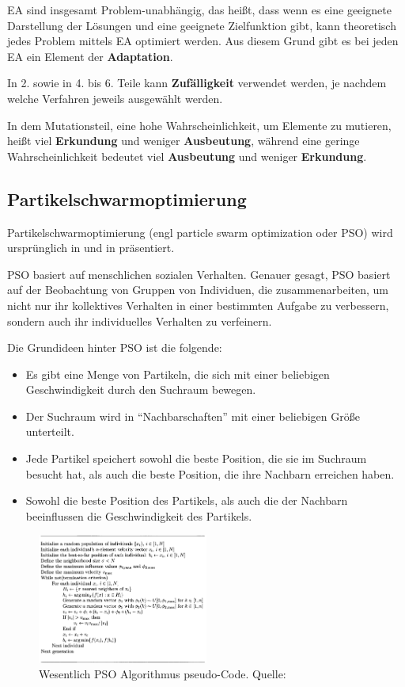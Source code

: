 \documentclass[twoside,twocolumn]{article}
\begin{document}
EA sind insgesamt Problem-unabhängig, das heißt, dass wenn es eine geeignete Darstellung der Lösungen und eine geeignete Zielfunktion gibt, kann theoretisch jedes Problem mittels EA optimiert werden. Aus diesem Grund gibt es bei jeden EA ein Element der \textbf{Adaptation}.\par
In 2. sowie in 4. bis 6. Teile kann \textbf{Zufälligkeit} verwendet werden, je nachdem welche Verfahren jeweils ausgewählt werden.\par
In dem Mutationsteil, eine hohe Wahrscheinlichkeit, um Elemente zu mutieren, heißt viel \textbf{Erkundung} und weniger \textbf{Ausbeutung}, während eine geringe Wahrscheinlichkeit bedeutet viel \textbf{Ausbeutung} und weniger \textbf{Erkundung}.

\subsection{Partikelschwarmoptimierung}
Partikelschwarmoptimierung (engl particle swarm optimization oder PSO) wird ursprünglich in \cite{kennedy_pso} und in \cite{shi_pso} präsentiert.\par
PSO basiert auf menschlichen sozialen Verhalten. \cite{eberhart_pso} Genauer gesagt, PSO basiert auf der Beobachtung von Gruppen von Individuen, die zusammenarbeiten, um nicht nur ihr kollektives Verhalten in einer bestimmten Aufgabe zu verbessern, sondern auch ihr individuelles Verhalten zu verfeinern.\par
Die Grundideen hinter PSO ist die folgende:

\begin{itemize}
\item{Es gibt eine Menge von Partikeln, die sich mit einer beliebigen Geschwindigkeit durch den Suchraum bewegen.}
\item{Der Suchraum wird in \enquote{Nachbarschaften} mit einer beliebigen Größe unterteilt.}
\item{Jede Partikel speichert sowohl die beste Position, die sie im Suchraum besucht hat, als auch die beste Position, die ihre Nachbarn erreichen haben.}
\item{Sowohl die beste Position des Partikels, als auch die der Nachbarn beeinflussen die Geschwindigkeit des Partikels.}
\end{itemize}

\begin{figure}
\caption{Wesentlich PSO Algorithmus pseudo-Code. Quelle: \cite{wiley_evolutionary}}
\label{fig:pso_pseudo}
\centering
\includegraphics[width=0.5\textwidth]{images/pso_pseudo.png}
\end{figure}
\end{document}
